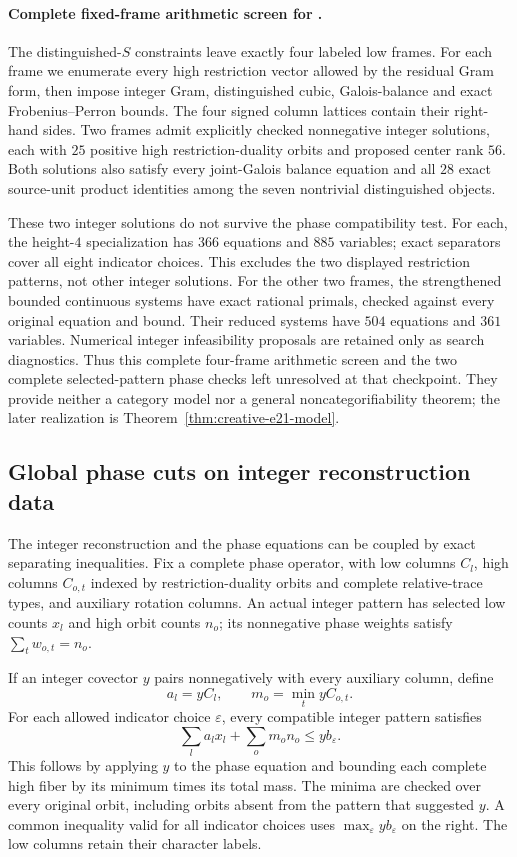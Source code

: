 \paragraph{Complete fixed-frame arithmetic screen for .}
The distinguished-$S$ constraints leave exactly four labeled low frames.
For each frame we enumerate every high restriction vector allowed by the
residual Gram form, then impose integer Gram, distinguished cubic,
Galois-balance and exact Frobenius--Perron bounds.  The four signed column
lattices contain their right-hand sides.  Two frames admit explicitly
checked nonnegative integer solutions, each with $25$ positive high
restriction-duality orbits and proposed center rank $56$.  Both solutions
also satisfy every joint-Galois balance equation and all $28$ exact
source-unit product identities among the seven nontrivial distinguished
objects.

These two integer solutions do not survive the phase compatibility test.
For each, the height-$4$ specialization has $366$ equations and $885$
variables; exact separators cover all eight indicator choices.  This
excludes the two displayed restriction patterns, not other integer
solutions.  For the other two frames, the strengthened bounded continuous
systems have exact rational primals, checked against every original
equation and bound.  Their reduced systems have $504$ equations and $361$
variables.  Numerical integer infeasibility proposals are retained only
as search diagnostics.  Thus this complete four-frame arithmetic screen
and the two complete selected-pattern phase checks left
 unresolved at that checkpoint. They provide neither a category
model nor a general noncategorifiability theorem; the later realization is
Theorem~\ref{thm:creative-e21-model}.

\subsection{Global phase cuts on integer reconstruction data}

The integer reconstruction and the phase equations can be coupled by
exact separating inequalities.  Fix a complete phase operator, with
low columns $C_l$, high columns $C_{o,t}$ indexed by restriction-duality
orbits and complete relative-trace types, and auxiliary rotation
columns.  An actual integer pattern has selected low counts $x_l$ and
high orbit counts $n_o$; its nonnegative phase weights satisfy
$\sum_t w_{o,t}=n_o$.

If an integer covector $y$ pairs nonnegatively with every auxiliary
column, define
\[
 a_l=yC_l,\qquad m_o=\min_t yC_{o,t}.
\]
For each allowed indicator choice $\varepsilon$, every compatible
integer pattern satisfies
\[
 \sum_l a_lx_l+\sum_o m_on_o\le yb_\varepsilon.
\]
This follows by applying $y$ to the phase equation and bounding each
complete high fiber by its minimum times its total mass.  The minima
are checked over every original orbit, including orbits absent from
the pattern that suggested $y$.  A common inequality valid for all
indicator choices uses $\max_\varepsilon yb_\varepsilon$ on the right.
The low columns retain their character labels.

